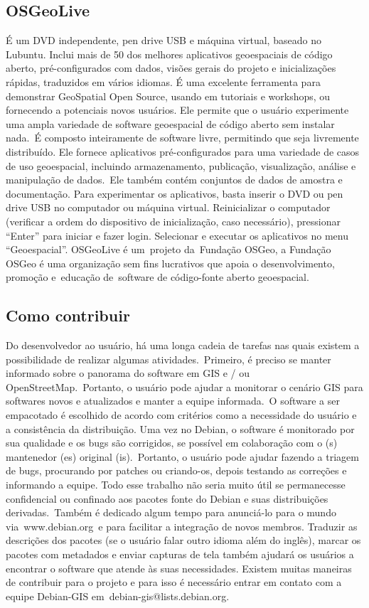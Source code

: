 \subsection{OSGeoLive}
É um DVD independente, pen drive USB e máquina virtual, baseado no Lubuntu. Inclui mais de 50 dos melhores aplicativos geoespaciais de código aberto, pré-configurados com dados, visões gerais do projeto e inicializações rápidas, traduzidos em vários idiomas. É uma excelente ferramenta para demonstrar GeoSpatial Open Source, usando em tutoriais e workshops, ou fornecendo a potenciais novos usuários. Ele permite que o usuário experimente uma ampla variedade de software geoespacial de código aberto sem instalar nada. É composto inteiramente de software livre, permitindo que seja livremente distribuído.  Ele fornece aplicativos pré-configurados para uma variedade de casos de uso geoespacial, incluindo armazenamento, publicação, visualização, análise e manipulação de dados. Ele também contém conjuntos de dados de amostra e documentação.
Para experimentar os aplicativos, basta inserir o DVD ou pen drive USB no computador ou máquina virtual. Reinicializar o computador (verificar a ordem do dispositivo de inicialização, caso necessário), pressionar “Enter” para iniciar e fazer login. Selecionar e executar os aplicativos no menu “Geoespacial”.
OSGeoLive é um projeto da Fundação OSGeo, a Fundação OSGeo é uma organização sem fins lucrativos que apoia o desenvolvimento, promoção e educação de software de código-fonte aberto geoespacial.


\subsection{Como contribuir}
Do desenvolvedor ao usuário, há uma longa cadeia de tarefas nas quais existem a possibilidade de realizar algumas atividades. Primeiro, é preciso se manter informado sobre o panorama do software em GIS e / ou OpenStreetMap. Portanto, o usuário pode ajudar a monitorar o cenário GIS para softwares novos e atualizados e manter a equipe informada. O software a ser empacotado é escolhido de acordo com critérios como a necessidade do usuário e a consistência da distribuição.
Uma vez no Debian, o software é monitorado por sua qualidade e os bugs são corrigidos, se possível em colaboração com o (s) mantenedor (es) original (is). Portanto, o usuário pode ajudar fazendo a triagem de bugs, procurando por patches ou criando-os, depois testando as correções e informando a equipe. Todo esse trabalho não seria muito útil se permanecesse confidencial ou confinado aos pacotes fonte do Debian e suas distribuições derivadas. Também é dedicado algum tempo para anunciá-lo para o mundo via www.debian.org e para facilitar a integração de novos membros. Traduzir as descrições dos pacotes (se o usuário falar outro idioma além do inglês), marcar os pacotes com metadados e enviar capturas de tela também ajudará os usuários a encontrar o software que atende às suas necessidades.
Existem muitas maneiras de contribuir para o projeto e para isso é necessário entrar em contato com a equipe Debian-GIS em debian-gis@lists.debian.org.

